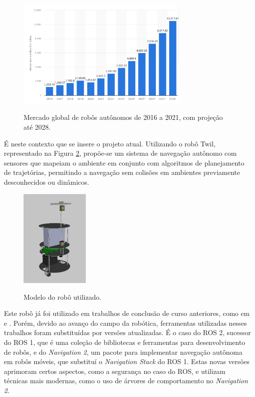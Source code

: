 \documentclass[repeatfields,xlists,xpacks,oneside,yearsonly]{ufrgscca}
\begin{document}

\begin{figure}[h]
    {
        \centering
        \caption{Mercado global de robôs autônomos de 2016 a 2021, com projeção até 2028.}
        \label{fig:mercado_robo}
        \includegraphics[width=0.75\textwidth]{mercado_robo}\\
    }
    {}
\end{figure}

É neste contexto que se insere o projeto atual.
Utilizando o robô Twil, representado na Figura \ref{fig:robo_rviz},
propõe-se um sistema de navegação autônomo com sensores
que mapeiam o ambiente em conjunto com algoritmos de planejamento
de trajetórias, permitindo a navegação sem colisões em ambientes previamente
desconhecidos ou dinâmicos.

\begin{figure}[H]
    {
        \centering
        \caption{Modelo do robô utilizado.}
        \label{fig:robo_rviz}
        \includegraphics[width=0.3\textwidth]{robo_rviz.png}\\
    }
\end{figure}

Este robô já foi utilizado em trabalhos de conclusão de curso
anteriores, como em \textcite{petry_tcc} e \textcite{rahul_tcc}.
Porém, devido ao avanço do campo da robótica, ferramentas utilizadas
nesses trabalhos foram substituídas por versões atualizadas. É o caso
do ROS 2, sucessor do ROS 1, que é uma coleção de bibliotecas e
ferramentas para desenvolvimento de robôs, e do \textit{Navigation
    2}, um pacote para implementar navegação autônoma em robôs móveis,
que substituí o \textit{Navigation Stack} do ROS 1. Estas novas
versões aprimoram certos aspectos, como a segurança no caso do ROS, e
utilizam técnicas mais modernas, como o uso de árvores de
comportamento no \textit{Navigation 2}.
\end{document}
